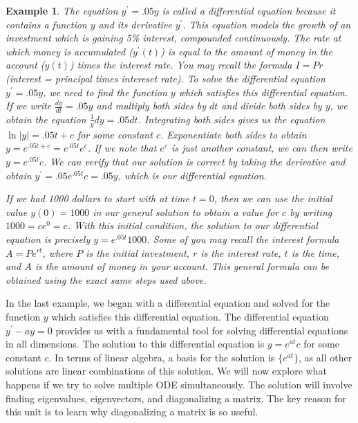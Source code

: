 \documentclass[10pt]{article}
\theoremstyle{plain}
\theoremstyle{box}
\newtheorem{example}{Example}
\begin{document}
\begin{example}
The equation $y^\prime = .05 y$ is called a differential equation because it contains a function $y$ and its derivative $y^\prime$.  This equation models the growth of an investment which is gaining 5\% interest, compounded continuously.  The rate at which money is accumulated ($y^\prime(t)$) is equal to the amount of money in the account ($y(t)$) times the interest rate.  You may recall the formula $I=Pr$ (interest = principal times intereset rate).  
To solve the differential equation $y^\prime = .05 y$, we need to find the function $y$ which satisfies this differential equation.  If we write $\frac{dy}{dt} = .05 y$ and multiply both sides by $dt$ and divide both sides by $y$, we obtain the equation $\frac{1}{y}dy=.05 dt$. Integrating both sides gives us the equation $\ln|y|=.05 t +c$ for some constant $c$. Exponentiate both sides to obtain $y=e^{.05 t+c} = e^{.05t}e^c$.  If we note that $e^c$ is just another constant, we can then write $y=e^{.05 t}c$.  We can verify that our solution is correct by taking the derivative and obtain $y^\prime = .05 e^{.05 t}c = .05 y$, which is our differential equation.

If we had 1000 dollars to start with at time $t=0$, then we can use the initial value $y(0)=1000$ in our general solution to obtain a value for $c$ by writing $1000 = c e^0=c$. With this initial condition, the solution to our differential equation is precisely $y = e^{.05 t} 1000$. Some of you may recall the interest formula $A=Pe^{rt}$, where $P$ is the initial investment, $r$ is the interest rate, $t$ is the time, and $A$ is the amount of money in your account. This general formula can be obtained using the exact same steps used above.
\end{example}

In the last example, we began with a differential equation and solved for the function $y$ which satisfies this differential equation. The differential equation $y^\prime - a y=0$ provides us with a fundamental tool for solving differential equations in all dimensions.  The solution to this differential equation is $y = e^{at}c$ for some constant $c$. In terms of linear algebra, a basis for the solution is $\{e^{at}\}$, as all other solutions are linear combinations of this solution.  We will now explore what happens if we try to solve multiple ODE simultaneously. The solution will involve finding eigenvalues, eigenvectors, and diagonalizing a matrix.  The key reason for this unit is to learn why diagonalizing a matrix is so useful.
\end{document}
